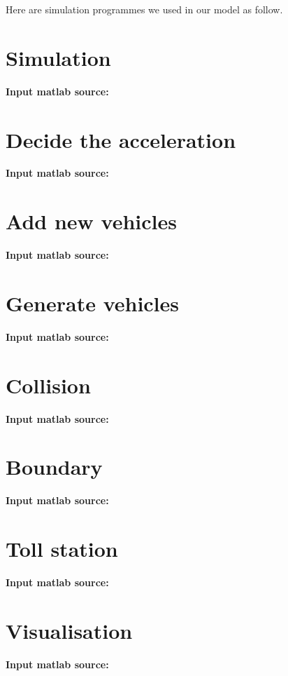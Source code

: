 \documentclass{mcmthesis}
\begin{document}
\begin{appendices}
	Here are simulation programmes we used in our model as follow.\\
\section{Simulation}
\textbf{\textcolor[rgb]{0.98,0.00,0.00}{Input matlab source:}}


\section{Decide the acceleration}
\textbf{\textcolor[rgb]{0.98,0.00,0.00}{Input matlab source:}}


\section{Add new vehicles}
\textbf{\textcolor[rgb]{0.98,0.00,0.00}{Input matlab source:}}


\section{Generate vehicles}
\textbf{\textcolor[rgb]{0.98,0.00,0.00}{Input matlab source:}}


\section{Collision}
\textbf{\textcolor[rgb]{0.98,0.00,0.00}{Input matlab source:}}


\section{Boundary}
\textbf{\textcolor[rgb]{0.98,0.00,0.00}{Input matlab source:}}


\section{Toll station}
\textbf{\textcolor[rgb]{0.98,0.00,0.00}{Input matlab source:}}


\section{Visualisation}
\textbf{\textcolor[rgb]{0.98,0.00,0.00}{Input matlab source:}}


\end{appendices}


	
\end{document}
